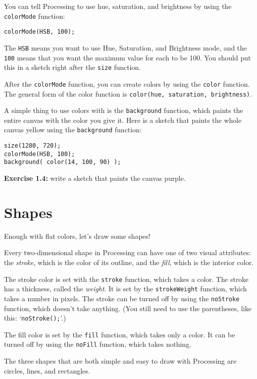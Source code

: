 \documentclass[
]{leaflet}
\begin{document}
You can tell Processing to use hue, saturation, and brightness by using the \texttt{colorMode} function:

\begin{lstlisting}
colorMode(HSB, 100);
\end{lstlisting}

The \texttt{HSB} means you want to use Hue, Saturation, and Brightness mode, and the \texttt{100} means that you want the maximum value for each to be 100.
You should put this in a sketch right after the \texttt{size} function.

After the \texttt{colorMode} function, you can create colors by using the \texttt{color} function.
The general form of the color function is \texttt{color(hue, saturation, brightness)}.

A simple thing to use colors with is the \texttt{background} function, which paints the entire canvas with the color you give it.
Here is a sketch that paints the whole canvas yellow using the \texttt{background} function:

\begin{lstlisting}
size(1280, 720);
colorMode(HSB, 100);
background( color(14, 100, 90) );
\end{lstlisting}

\textbf{Exercise 1.4:} write a sketch that paints the canvas purple.

\section{Shapes}

Enough with flat colors, let's draw some shapes!

Every two-dimensional shape in Processing can have one of two visual attributes: the \textit{stroke}, which is the color of its outline, and the \textit{fill}, which is the interior color.

The stroke color is set with the \texttt{stroke} function, which takes a color.
The stroke has a thickness, called the \textit{weight}.
It is set by the \texttt{strokeWeight} function, which takes a number in pixels.
The stroke can be turned off by using the \texttt{noStroke} function, which doesn't take anything.
(You still need to use the parentheses, like this: `\texttt{noStroke();}'.)

The fill color is set by the \texttt{fill} function, which takes only a color.
It can be turned off by using the \texttt{noFill} function, which takes nothing.

The three shapes that are both simple and easy to draw with Processing are circles, lines, and rectangles.
\end{document}
